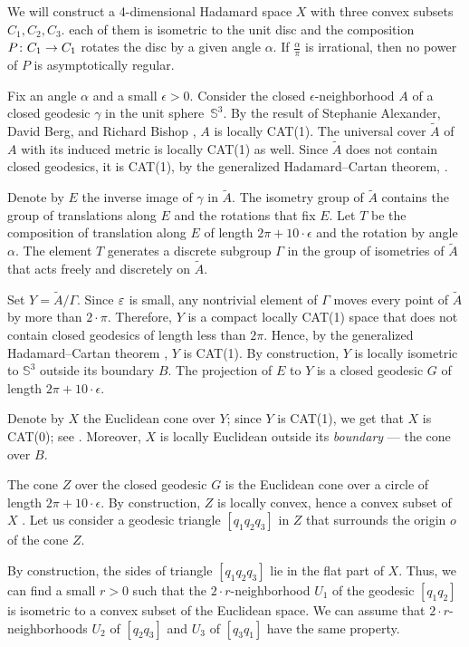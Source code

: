 \documentclass[a4paper,10pt]{article}
\begin{document}
We will construct a 4-dimensional Hadamard space $X$ with three convex subsets $C_1,C_2,C_3$.
each of them is isometric to the unit disc and the composition $P\:C_1\z\to C_1$ rotates the disc by a given angle $\alpha$.
If  $\frac \alpha \pi$ is irrational, then no power of $P$ is asymptotically regular.

Fix an angle $\alpha$ and a small $\epsilon>0$.
Consider the closed 
$\epsilon$-neighborhood $A$ of a closed geodesic $\gamma$ in the unit sphere~$\mathbb{S}^3$.
By the result of Stephanie Alexander,  David Berg, and Richard Bishop \cite {ABB-1993}, $A$ is locally CAT(1).
The universal cover $\tilde A$ of $A$ with its induced metric is locally CAT(1) as well. 
Since $\tilde A$ does not contain closed geodesics, it is CAT(1), by  the generalized Hadamard--Cartan theorem, \cite{AKP,bowditch}.

Denote by $E$ the inverse image of $\gamma$ in $\tilde A$.
The isometry group of $\tilde A$ 
contains the group of translations along $E$ and 
the rotations that fix $E$.
Let $T$  be the composition of translation along $E$  of length $2\pi +10\cdot\epsilon$ and the rotation by angle $\alpha$.
The element $T$ generates a discrete subgroup $\Gamma$ in the group of isometries  of $\tilde A$ that acts freely and discretely on $\tilde A$.

Set $Y =\tilde A/\Gamma$.
Since $\varepsilon$ is small, any nontrivial element of $\Gamma$ moves
every point of $\tilde A$ by more than $2\cdot\pi$.
Therefore, $Y$ is a compact locally CAT(1) space that does not contain closed geodesics of length less than $2\pi$.
Hence, by  the generalized Hadamard--Cartan theorem \cite{AKP}, $Y$ is CAT(1).
By construction, $Y$ is locally isometric to $\mathbb{S}^3$ outside its boundary $B$.
The projection of $E$ to $Y$ is a closed geodesic $G$ of length $2\pi +10\cdot\epsilon$.

Denote by $X$ the Euclidean cone over $Y$;
since $Y$ is CAT(1), we get that $X$ is CAT(0); see \cite{AKP}.
Moreover, $X$ is locally Euclidean outside its \emph{boundary} --- the cone over $B$.

The cone $Z$ over the closed geodesic $G$ is  the Euclidean cone over a circle of length $2\pi +10\cdot\epsilon$.
By construction, $Z$ is locally convex, hence a convex subset of~$X$ \cite[2.2.12]{AKP_inv}.
Let us consider a geodesic triangle
$[q_1q_2q_3]$
in $Z$ that surrounds the origin $o$ of the cone $Z$.

By construction, the sides of triangle $[q_1q_2q_3]$ lie in the flat part of $X$.
Thus, we can find a small $r>0$ such that the $2\cdot r$-neighborhood $U_1$ of the geodesic $[q_1q_2]$ is isometric to a convex subset of the Euclidean space.
We can assume that $2\cdot r$-neighborhoods $U_2$ of $[q_2q_3]$ and $U_3$ of $[q_3q_1]$ have the same property.
\end{document}
